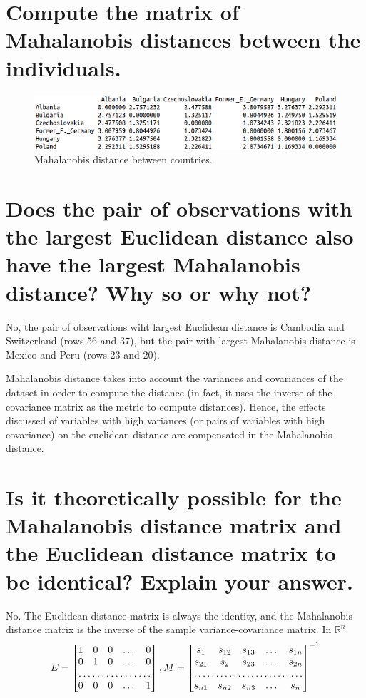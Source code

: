 \documentclass[10pt, a4paper, oneside]{article}
\newcommand{\R}{\ensuremath{\mathbb{R}}}
\begin{document}
\pagebreak

\section{Compute the matrix of Mahalanobis distances between the individuals.}

\vspace{5mm}
\begin{figure}[h!]\centering\includegraphics[scale=0.6]{pov_mahala_dist.png}\caption{Mahalanobis distance between countries.}\label{pov_maha}\end{figure}
\vspace{5mm}

\section{Does the pair of observations with the largest Euclidean distance also have the largest Mahalanobis distance? Why so or why not?}

No, the pair of observations wiht largest Euclidean distance is Cambodia and Switzerland (rows 56 and 37), but the pair with largest Mahalanobis distance is Mexico and Peru (rows 23 and 20).

Mahalanobis distance takes into account the variances and covariances of the dataset in order to compute the distance (in fact, it uses the inverse of the covariance matrix as the metric to compute distances). Hence, the effects discussed of variables with high variances (or pairs of variables with high covariance) on the euclidean distance are compensated in the Mahalanobis distance.

\section{Is it theoretically possible for the Mahalanobis distance matrix and the Euclidean distance matrix to be identical? Explain your answer.}

No. The Euclidean distance matrix is always the identity, and the Mahalanobis distance matrix is the inverse of the sample variance-covariance matrix. In $\R^n$
\[
E = \begin{bmatrix}
    1 & 0 & 0 & \dots & 0 \\
    0 & 1 & 0 & \dots & 0 \\
    \hdotsfor{5} \\
    0 & 0 & 0 & \dots & 1
\end{bmatrix},
M = \begin{bmatrix}
    s_{1}       & s_{12} & s_{13} & \dots & s_{1n} \\
    s_{21}       & s_{2} & s_{23} & \dots & s_{2n} \\
    \hdotsfor{5} \\
    s_{n1}       & s_{n2} & s_{n3} & \dots & s_{n}
\end{bmatrix} ^{-1}
\]
\end{document}
